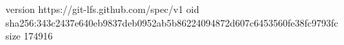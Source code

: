 version https://git-lfs.github.com/spec/v1
oid sha256:343c2437e640eb9837deb0952ab5b86224094872d607c6453560fe38fc9793fc
size 174916
